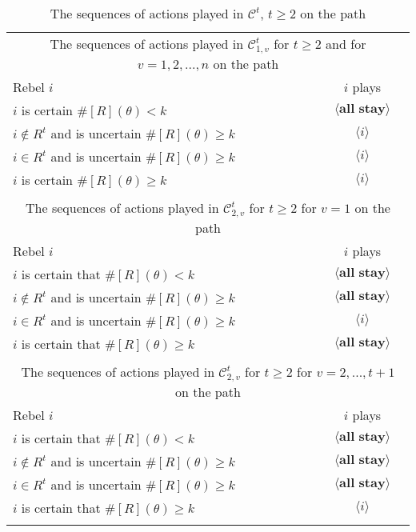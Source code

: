 \documentclass[12pt,letter]{article}
\newcommand{\Kappa}{\mathcal{C}}
\theoremstyle{definition}
\theoremstyle{remark}
\theoremstyle{claim}
\begin{document}
\begin{table}[!htbp]
\caption{The sequences of actions played in $\Kappa^t$, $t\geq 2$ on the path}
\label{Table_cdt}
\begin{center}
\begin{tabular}{l c}
\multicolumn{2}{c}{The sequences of actions played in $\Kappa^t_{1,v}$ for $t\geq 2$ and for $v=1,2,...,n$ on the path}\\
Rebel $i$ 	 	&  	$i$ plays		 \\
\hline
\hline
$i$ is certain $\#[R](\theta)<k$ 	& 	$\langle \textbf{all stay} \rangle$	\\
$i\notin R^{t}$ and is uncertain $\#[R](\theta)\geq k$	& 	$\langle i \rangle$	\\
$i\in R^{t}$ and is uncertain $\#[R](\theta)\geq k$ &  $\langle i \rangle$  \\
$i$ is certain $\#[R](\theta)\geq k$ &  $\langle i \rangle$  \\
\hline
\\
\multicolumn{2}{c}{The sequences of actions played in $\Kappa^t_{2,v}$ for $t\geq 2$ for $v=1$ on the path}\\
Rebel $i$ 	 	&  	$i$ plays		 \\
\hline
\hline
$i$ is certain that $\#[R](\theta)<k$ 	& 	$\langle \textbf{all stay} \rangle$	\\
$i\notin R^{t}$ and is uncertain $\#[R](\theta)\geq k$	& 	$\langle \textbf{all stay} \rangle$	\\
$i\in R^{t}$ and is uncertain $\#[R](\theta)\geq k$ &  $\langle i \rangle$  \\
$i$ is certain that $\#[R](\theta)\geq k$ &  $\langle \textbf{all stay} \rangle$  \\
\hline
\\
\multicolumn{2}{c}{The sequences of actions played in $\Kappa^t_{2,v}$ for $t\geq 2$ for $v=2,...,t+1$ on the path}\\
Rebel $i$ 	 	&  	$i$ plays		 \\
\hline
\hline
$i$ is certain that $\#[R](\theta)<k$ 	& 	$\langle \textbf{all stay} \rangle$	\\
$i\notin R^{t}$ and is uncertain $\#[R](\theta)\geq k$	& 	$\langle \textbf{all stay} \rangle$	\\
$i\in R^{t}$ and is uncertain $\#[R](\theta)\geq k$ &  $\langle \textbf{all stay} \rangle$  \\
$i$ is certain that $\#[R](\theta)\geq k$ &  $\langle i \rangle$  \\
\hline
\\

\end{tabular}
\end{center}
\end{table}
\end{document}
